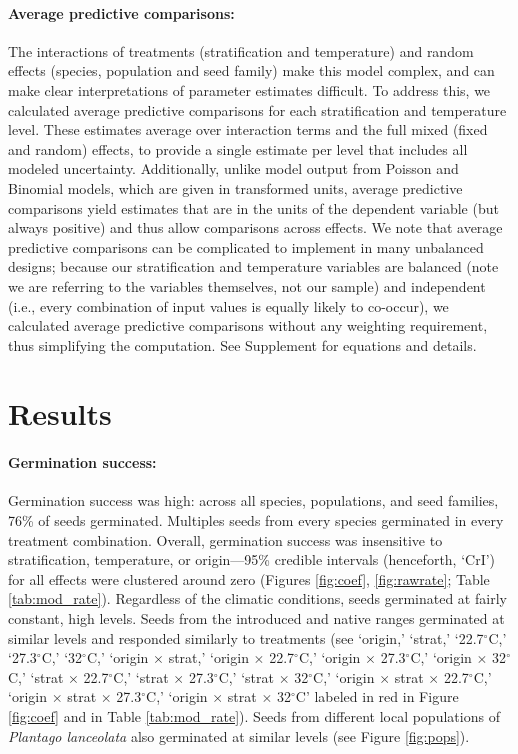 \documentclass[11pt]{article}\usepackage[]{graphicx}\usepackage[]{color}
\begin{document}
	\paragraph{Average predictive comparisons:} The interactions of treatments (stratification and temperature) and random effects (species, population and seed family) make this model complex, and can make clear interpretations of parameter estimates difficult. To address this, we calculated average predictive comparisons \parencite{Gelman2007} for each stratification and  temperature level. These estimates average over interaction terms and the full mixed (fixed and random) effects, to provide a single estimate per level that includes all modeled uncertainty. Additionally, unlike model output from Poisson and Binomial models, which are given in transformed units, average predictive comparisons yield estimates that are in the units of the dependent variable (but always positive) \parencite{Gelman2007} and thus allow comparisons across effects. We note that average predictive comparisons can be complicated to implement in many unbalanced designs; because our stratification and temperature variables are balanced (note we are referring to the variables themselves, not our sample) and independent (i.e., every combination of input values is equally likely to co-occur), we calculated average predictive comparisons without any weighting requirement, thus simplifying the computation. See Supplement for equations and details.

	\section{Results} 
		
	\paragraph{Germination success:} Germination success was high: across all species, populations, and seed families, 76\% of seeds germinated. Multiples seeds from every species germinated in every treatment combination. Overall, germination success was insensitive to stratification, temperature, or origin---95\% credible intervals (henceforth, `CrI') for all effects were clustered around zero (Figures \ref{fig:coef}, \ref{fig:rawrate}; Table \ref{tab:mod_rate}). Regardless of the climatic conditions, seeds germinated at fairly constant, high levels. Seeds from the introduced and native ranges germinated at similar levels and responded similarly to treatments (see `origin,' `strat,' `22.7$^{\circ}$C,' `27.3$^{\circ}$C,' `32$^{\circ}$C,' `origin $\times$ strat,' `origin $\times$ 22.7$^{\circ}$C,' `origin $\times$ 27.3$^{\circ}$C,' `origin $\times$ 32$^{\circ}$C,' `strat $\times$ 22.7$^{\circ}$C,' `strat $\times$ 27.3$^{\circ}$C,' `strat $\times$ 32$^{\circ}$C,' `origin $\times$ strat $\times$ 22.7$^{\circ}$C,' `origin $\times$ strat $\times$ 27.3$^{\circ}$C,' `origin $\times$ strat $\times$ 32$^{\circ}$C' labeled in red in Figure \ref{fig:coef} and in Table \ref{tab:mod_rate}). Seeds from different local populations of \textit{Plantago lanceolata} also germinated at similar levels (see Figure \ref{fig:pops}).
\end{document}
